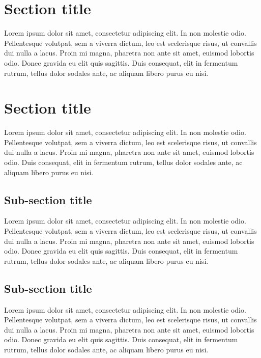 \section{Section title}
Lorem ipsum dolor sit amet, consectetur adipiscing elit. In non molestie odio. Pellentesque volutpat, sem a viverra dictum, leo est scelerisque risus, ut convallis dui nulla a lacus. Proin mi magna, pharetra non ante sit amet, euismod lobortis odio. Donec gravida eu elit quis sagittis. Duis consequat, elit in fermentum rutrum, tellus dolor sodales ante, ac aliquam libero purus eu nisi. 

\section{Section title}
Lorem ipsum dolor sit amet, consectetur adipiscing elit. In non molestie odio. Pellentesque volutpat, sem a viverra dictum, leo est scelerisque risus, ut convallis dui nulla a lacus. Proin mi magna, pharetra non ante sit amet, euismod lobortis odio. Duis consequat, elit in fermentum rutrum, tellus dolor sodales ante, ac aliquam libero purus eu nisi. 

\subsection{Sub-section title}
Lorem ipsum dolor sit amet, consectetur adipiscing elit. In non molestie odio. Pellentesque volutpat, sem a viverra dictum, leo est scelerisque risus, ut convallis dui nulla a lacus. Proin mi magna, pharetra non ante sit amet, euismod lobortis odio.  Donec gravida eu elit quis sagittis. Duis consequat, elit in fermentum rutrum, tellus dolor sodales ante, ac aliquam libero purus eu nisi. 

\subsection{Sub-section title}
Lorem ipsum dolor sit amet, consectetur adipiscing elit. In non molestie odio. Pellentesque volutpat, sem a viverra dictum, leo est scelerisque risus, ut convallis dui nulla a lacus. Proin mi magna, pharetra non ante sit amet, euismod lobortis odio. Donec gravida eu elit quis sagittis. Duis consequat, elit in fermentum rutrum, tellus dolor sodales ante, ac aliquam libero purus eu nisi.

